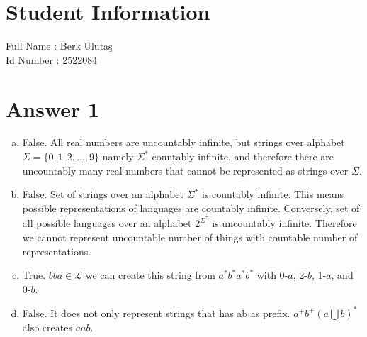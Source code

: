 \documentclass[12pt]{article}
\begin{document}
\section*{Student Information } 
Full Name : Berk Ulutaş \\
Id Number : 2522084 \\

\section*{Answer 1}
\begin{enumerate}[a)]
    \item False. All real numbers are uncountably infinite, but strings over alphabet $\Sigma = \{0,1,2,\dots,9\}$ namely $\Sigma^* $ countably infinite, and therefore there are uncountably many real numbers that cannot be represented as strings over $\Sigma$.
    \item False. Set of strings over an alphabet $\Sigma^*$ is countably infinite. This means possible representations of languages are countably infinite. Conversely, set of all possible languages over an alphabet $2^{\Sigma^*}$ is uncountably infinite. Therefore we cannot represent uncountable number of things with countable number of representations.
    \item True. $bba \in \mathcal{L}$ we can create this string from $a^*b^*a^*b^*$ with 0-$a$, 2-$b$, 1-$a$, and 0-$b$. 
    \item False. It does not only represent strings that has ab as prefix. $a^+b^+(a \bigcup b)^*$ also creates $aab$. 
    
\end{enumerate}
\end{document}
